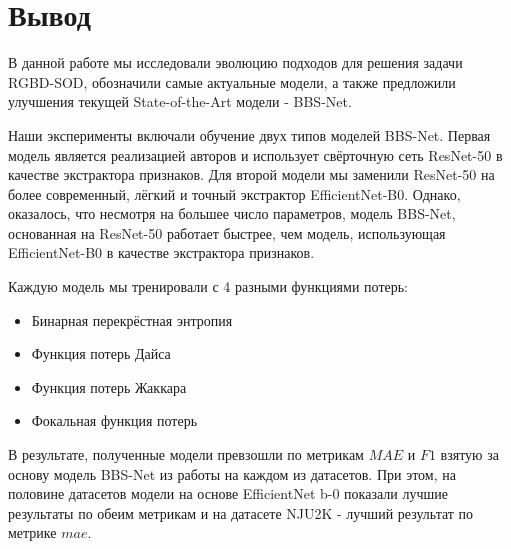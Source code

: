 \section{Вывод}


В данной работе мы исследовали эволюцию подходов для решения задачи RGBD-SOD, обозначили самые актуальные модели,
а также предложили улучшения текущей State-of-the-Art модели - BBS-Net\cite{BBS}.

Наши эксперименты включали обучение двух типов моделей BBS-Net. Первая модель является реализацией авторов \cite{BBS} и
использует свёрточную сеть ResNet-50\cite{ResNet} в качестве экстрактора признаков. Для второй модели мы заменили ResNet-50 на более
современный, лёгкий и точный экстрактор EfficientNet-B0\cite{Efficientnet}. Однако, оказалось, что несмотря на большее число параметров, модель BBS-Net,
основанная на ResNet-50 работает быстрее, чем модель, использующая EfficientNet-B0 в качестве экстрактора признаков.

Каждую модель мы тренировали с 4 разными функциями потерь:
\begin{itemize}
    \item Бинарная перекрёстная энтропия \cite{CE}
    \item Функция потерь Дайса\cite{Dice-Loss}
    \item Функция потерь Жаккара\cite{IoU-Loss}
    \item Фокальная функция потерь \cite{Focal-Loss}
\end{itemize}

В результате, полученные модели превзошли по метрикам $MAE$ и $F1$ взятую за основу модель BBS-Net из работы \cite{BBS}
на каждом из датасетов. При этом, на половине датасетов модели на основе EfficientNet b-0 показали
лучшие результаты по обеим метрикам и на датасете NJU2K - лучший результат по метрике $mae$.